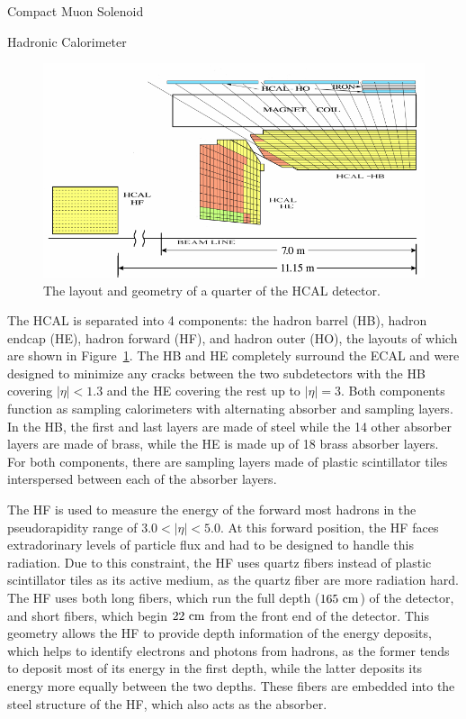 \begin{section}{Compact Muon Solenoid}
\begin{subsection}{Hadronic Calorimeter}
\begin{figure}[tbp!]
\begin{center}
\includegraphics[angle=0,width=0.80\columnwidth]{fig/cms_hcal.png}
\end{center}
\caption{The layout and geometry of a quarter of the HCAL detector.~\cite{1748-0221-5-03-T03014}}
\label{fig:cms_hcal}
\end{figure}

The HCAL is separated into 4 components: the hadron barrel (HB), hadron endcap (HE), hadron forward (HF), and hadron outer (HO), the layouts of which are shown in Figure~\ref{fig:cms_hcal}.
The HB and HE completely surround the ECAL and were designed to minimize any cracks between the two subdetectors with the HB covering $|\eta| < 1.3$ and the HE covering the rest up to $|\eta| = 3$.
Both components function as sampling calorimeters with alternating absorber and sampling layers.
In the HB, the first and last layers are made of steel while the 14 other absorber layers are made of brass, while the HE is made up of 18 brass absorber layers.
For both components, there are sampling layers made of plastic scintillator tiles interspersed between each of the absorber layers.

The HF is used to measure the energy of the forward most hadrons in the pseudorapidity range of $3.0 < |\eta| < 5.0$.
At this forward position, the HF faces extradorinary levels of particle flux and had to be designed to handle this radiation.
Due to this constraint, the HF uses quartz fibers instead of plastic scintillator tiles as its active medium, as the quartz fiber are more radiation hard.
The HF uses both long fibers, which run the full depth ($165~\mathrm{cm}$) of the detector, and short fibers, which begin $22~\mathrm{cm}$ from the front end of the detector.
This geometry allows the HF to provide depth information of the energy deposits, which helps to identify electrons and photons from hadrons, as the former tends to deposit most of its energy in the first depth, while the latter deposits its energy more equally between the two depths.
These fibers are embedded into the steel structure of the HF, which also acts as the absorber.


\end{subsection}
\end{section}
